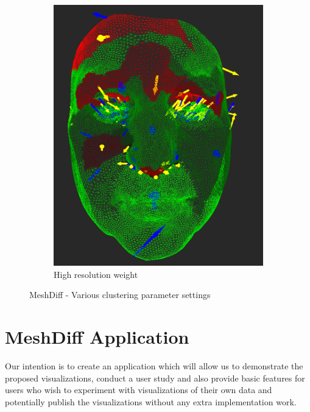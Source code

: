 \begin{figure}[h]
\begin{subfigure}{0.3\textwidth}
	\includegraphics[width=\textwidth]{./img/meshdiff-high_resolution.PNG}
	\caption{High resolution weight}
	\label{fig:meshdiff_high_resolution}
	\end{subfigure}
\caption{MeshDiff - Various clustering parameter settings}
\end{figure}

\section{MeshDiff Application}

Our intention is to create an application which will allow us to demonstrate the proposed visualizations, conduct a user study and also provide basic features for users who wish to experiment with visualizations of their own data and potentially publish the visualizations without any extra implementation work.

